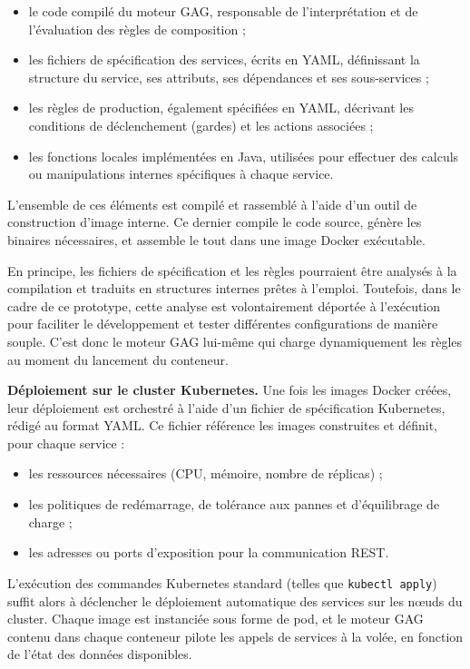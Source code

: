 \begin{itemize}
  \item le code compilé du moteur GAG, responsable de l’interprétation et de l’évaluation des règles de composition ;
  \item les fichiers de spécification des services, écrits en YAML, définissant la structure du service, ses attributs, ses dépendances et ses sous-services ;
  \item les règles de production, également spécifiées en YAML, décrivant les conditions de déclenchement (gardes) et les actions associées ;
  \item les fonctions locales implémentées en Java, utilisées pour effectuer des calculs ou manipulations internes spécifiques à chaque service.
\end{itemize}

L’ensemble de ces éléments est compilé et rassemblé à l’aide d’un outil de construction d’image interne. Ce dernier compile le code source, génère les binaires nécessaires, et assemble le tout dans une image Docker exécutable.

En principe, les fichiers de spécification et les règles pourraient être analysés à la compilation et traduits en structures internes prêtes à l’emploi. Toutefois, dans le cadre de ce prototype, cette analyse est volontairement déportée à l’exécution pour faciliter le développement et tester différentes configurations de manière souple. C’est donc le moteur GAG lui-même qui charge dynamiquement les règles au moment du lancement du conteneur.


\textbf{Déploiement sur le cluster Kubernetes.}
Une fois les images Docker créées, leur déploiement est orchestré à l’aide d’un fichier de spécification Kubernetes, rédigé au format YAML. Ce fichier référence les images construites et définit, pour chaque service :
\begin{itemize}
    \item les ressources nécessaires (CPU, mémoire, nombre de réplicas) ;
    \item les politiques de redémarrage, de tolérance aux pannes et d’équilibrage de charge ;
    \item les adresses ou ports d’exposition pour la communication REST.
\end{itemize}

L’exécution des commandes Kubernetes standard (telles que \texttt{kubectl apply}) suffit alors à déclencher le déploiement automatique des services sur les nœuds du cluster. Chaque image est instanciée sous forme de pod, et le moteur GAG contenu dans chaque conteneur pilote les appels de services à la volée, en fonction de l’état des données disponibles.


